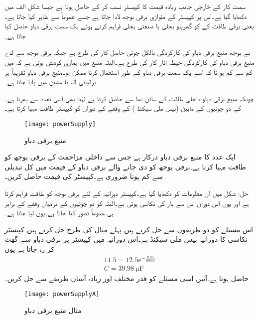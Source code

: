 سمت کار کے خارجی جانب زیادہ قیمت کا کپیسٹر نسب کر کے   حاصل ہوتا ہے جیسا شکل  الف میں دکھایا گیا ہے۔اس پر کپیسٹر کے متوازی برقی بوجھ لادا جاتا ہے جسے عموماً  سے ظاہر کیا جاتا ہے۔ یعنی برقی طاقت کے  کو  گھریلو بجلی یا صنعتی بجلی فراہم کرتے ہوئے یک سمت برقی دباو  حاصل کیا جاتا ہے۔
 
بے بوجھ منبع برقی دباو کی کارکردگی بالکل چوٹی حاصل کار کی طرح ہے جبکہ برقی بوجھ سے لدے منبع برقی دباو کی کارکردگی حیطہ اتار کار کی طرح ہے۔البتہ منبع میں ہماری کوشش ہوتی ہے کہ   میں  کم سے کم ہو تا کہ اسے یک سمت برقی دباو کے طور استعمال کرنا ممکن ہو۔منبع برقی دباو تقریباً ہر برقیاتی آلہ یا مشین میں پایا جاتا ہے۔

چونکہ منبع برقی دباو داخلی طاقت  کے سائن نما  سے حاصل کرتا ہے لہٰذا  بھی اسی تعدد سے بھرتا ہے۔ کے دو چوٹیوں کے مابین   (بیس ملی سیکنڈ )  کے وقفے  کے دوران  کو کپیسٹر  طاقت مہیا کرتا ہے۔
\begin{figure}
\centering
\texttt{[image: powerSupply]}
\caption{منبع برقی دباو}
\label{شکل_پاور_منبع}
\end{figure}
 
ایک عدد  کا منبع برقی دباو درکار ہے جس سے  داخلی مزاحمت کے برقی بوجھ کو طاقت مہیا کرنا ہے۔برقی بوجھ کو دی جانے والے برقی دباو کے قیمت میں کل تبدیلی  سے کم ہونا ضروری ہے۔کپیسٹر  کی قیمت حاصل کریں۔

حل: 
شکل  میں ان معلومات کو دکھایا گیا ہے۔کپیسٹر  دورانیہ کے لئے  برقی بوجھ کو طاقت فراہم کرتا ہے اور یوں اس دوران اس سے بار کی نکاسی ہوتی ہے۔البتہ  کو دو چوٹیوں کے درمیان وقفے کے برابر ہی عموماً تصور کیا جاتا ہے۔یوں  لیا جاتا ہے۔

اس مسئلے کو دو طریقوں سے حل کرتے ہیں۔پہلے مثال  کی طرح حل کرتے ہیں۔کپیسٹر نکاسی  کا دورانیہ بیس ملی سیکنڈ ہے۔اس دورانیہ میں  کپیسٹر پر  برقی دباو  سے گھٹ کر  رہ جاتا ہے یوں
\begin{align*}
11.5=12.5 e^{-\frac{0.02}{6000C}}\\
C=\SI{39.98}{\micro \farad}
\end{align*}
حاصل ہوتا ہے۔آئیں اسی مسئلے کو قدر مختلف اور زیادہ آسان طریقے سے حل کریں۔
% 
 \begin{figure}
\centering
\texttt{[image: powerSupplyA]}
\caption{مثال منبع برقی دباو}
\label{شکل_مثال_پاور_منبع}
\end{figure}

